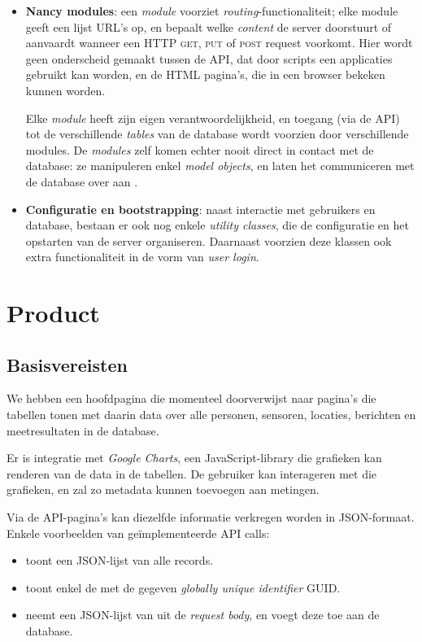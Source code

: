 \documentclass[12pt,a4paper,parskip=full]{article}
\begin{document}
\begin{itemize}
\item \textbf{Nancy modules}: een \emph{module} voorziet 
\emph{routing}-functionaliteit; elke module geeft een lijst URL's op, en 
bepaalt welke \emph{content} de server doorstuurt of aanvaardt wanneer een HTTP 
\textsc{get}, \textsc{put} of \textsc{post} request voorkomt. Hier wordt geen 
onderscheid gemaakt tussen de API, dat door scripts een applicaties gebruikt 
kan worden, en de HTML pagina's, die in een browser bekeken kunnen worden.

Elke \emph{module} heeft zijn eigen verantwoordelijkheid, en toegang (via de 
API) tot de verschillende \emph{tables} van de database wordt voorzien door 
verschillende modules. De \emph{modules} zelf komen echter nooit direct in 
contact met de database: ze manipuleren enkel \emph{model objects}, en laten 
het communiceren met de database over aan .

\item \textbf{Configuratie en bootstrapping}: naast interactie met gebruikers en database, bestaan er ook nog enkele \emph{utility classes}, die de configuratie en het opstarten van de server organiseren. Daarnaast voorzien deze klassen ook extra functionaliteit in de vorm van \emph{user login}. 

\end{itemize}
\section{Product}

\subsection{Basisvereisten}
We hebben een hoofdpagina die momenteel doorverwijst naar 
pagina's die tabellen tonen met daarin data over alle personen, sensoren, 
locaties, berichten en meetresultaten 
in de database.

Er is integratie met \textit{Google Charts}, een JavaScript-library die 
grafieken kan 
renderen van de data in de tabellen. De gebruiker kan interageren met die 
grafieken, en zal zo metadata kunnen toevoegen aan metingen.

Via de API-pagina's kan diezelfde informatie verkregen worden 
in JSON-formaat. Enkele voorbeelden van ge\"implementeerde API calls:
\begin{itemize}
  \item {} toont een JSON-lijst van alle  
  records.
  \item {} toont enkel de 
  met de 
  gegeven \textit{globally unique identifier} GUID.
  \item {} neemt een JSON-lijst van  
  uit de \textit{request body}, en voegt deze toe aan de database.
\end{itemize}
\end{document}
